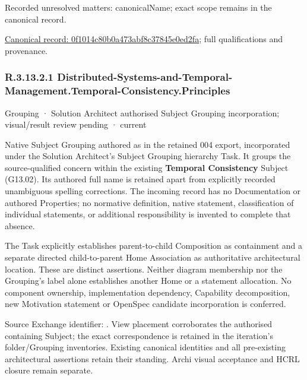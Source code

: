 {\small Recorded unresolved matters: canonicalName; exact scope remains in the canonical record.}\par
{\footnotesize \href{../../../../continuum/grouping/0f1014c80b0a473abf8c37845e0ed2fa.md}{Canonical record: 0f1014c80b0a473abf8c37845e0ed2fa}; full qualifications and provenance.}\par
\subsubsection*{R.3.13.2.1 Distributed-Systems-and-Temporal-Management.Temporal-Consistency.Principles}
\label{navigation:R.3.13.2.1}

\label{element:8e39da9fc2d443efa3cc5d0311fcaf79}
{\small Grouping · Solution Architect authorised Subject Grouping incorporation; visual/result review pending · current}\par

Native Subject Grouping authored as \texttt{} in the retained 004 export,
incorporated under the Solution Architect's Subject Grouping hierarchy Task.
It groups the source-qualified \texttt{} concern within
the existing \textbf{Temporal Consistency} Subject (G13.02). Its authored full name
is retained apart from explicitly recorded unambiguous spelling corrections.
The incoming record has no Documentation or authored Properties; no normative
definition, native statement, classification of individual statements, or
additional responsibility is invented to complete that absence.



The Task explicitly establishes parent-to-child Composition as containment and
a separate directed child-to-parent Home Association as authoritative architectural
location. These are distinct assertions. Neither diagram membership nor the
Grouping's label alone establishes another Home or a statement allocation.
No component ownership, implementation dependency, Capability decomposition,
new Motivation statement or OpenSpec candidate incorporation is conferred.



Source Exchange identifier: \texttt{}. View placement corroborates
the authorised containing Subject; the exact correspondence is retained in the
iteration's folder/Grouping inventories. Existing canonical identities and all
pre-existing architectural assertions retain their standing. Archi visual
acceptance and HCRL closure remain separate.


